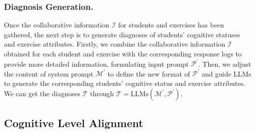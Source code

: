 \subsubsection{Diagnosis Generation.}
Once the collaborative information $\mathcal{I}$ for students and exercises has been gathered, the next step is to generate diagnoses of students' cognitive statuses and exercise attributes.
Firstly, we combine the collaborative information $\mathcal{I}$ obtained for each student and exercise with the corresponding response logs to provide more detailed information, formulating input prompt $\mathcal{P}^\prime$.
Then, we adjust the content of system prompt $\mathcal{M}^\prime$ to define the new format of $\mathcal{P}^\prime$ and guide LLMs to generate the corresponding students' cognitive status and exercise attributes. We can get the diagnoses $\mathcal{T}$ through $\mathcal{T}=\text{LLMs}\left(\mathcal{M}^\prime, \mathcal{P}^\prime\right)$. 


\subsection{Cognitive Level Alignment}


